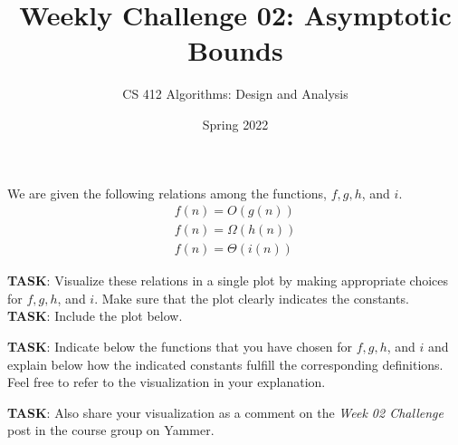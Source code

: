 \documentclass[a4paper]{exam}
\title{Weekly Challenge 02: Asymptotic Bounds}
\author{CS 412 Algorithms: Design and Analysis}
\date{Spring 2022}
\begin{document}
\maketitle

\begin{questions}
  
\question We are given the following relations among the functions, $f, g, h$, and $i$.
  \begin{align*}
    f(n) = O(g(n))\\
    f(n) = \Omega(h(n))\\
    f(n) = \Theta(i(n))
  \end{align*}




  \noindent\textbf{TASK}: Visualize these relations in a single plot by making appropriate choices for $f, g, h$, and $i$. Make sure that the plot clearly indicates the constants. \\
  \noindent\textbf{TASK}: Include the plot below.
  
  \noindent\textbf{TASK}: Indicate below the functions that you have chosen for $f, g, h$, and $i$ and explain below how the indicated constants fulfill the corresponding definitions. Feel free to refer to the visualization in your explanation.
  
  \noindent\textbf{TASK}:  Also share your visualization as a comment on the \textit{Week 02 Challenge} post in the course group on Yammer.


\end{questions}
\end{document}
